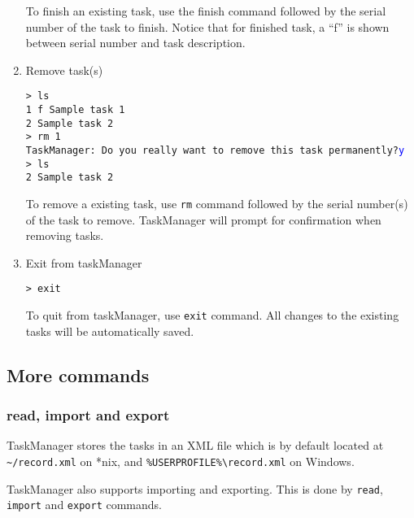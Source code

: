 \documentclass[12pt, a4paper]{article}
\begin{document}
\begin{enumerate}
To finish an existing task, use the finish command followed by the serial number of the task to finish. 
Notice that for finished task, a ``f'' is shown between serial number and task description.

\item Remove task(s)

\texttt{\textgreater \ ls\\
    1 f Sample task 1\\
    2   Sample task 2\\
    \textgreater \ rm 1\\
    TaskManager: Do you really want to remove this task permanently?\textcolor{blue}{y}\\
    \textgreater \ ls\\
    2   Sample task 2}

To remove a existing task, use \texttt{rm} command followed by the serial number(s) of the task to remove. TaskManager will prompt for confirmation when removing tasks.

\item Exit from taskManager

\texttt{\textgreater \ exit}

To quit from taskManager, use \texttt{exit} command. 
All changes to the existing tasks will be automatically saved.
\end{enumerate}

\subsection{More commands}
\subsubsection{read, import and export}

TaskManager stores the tasks in an XML file which is by default located at
\texttt{\~{}/record.xml} on *nix, and \texttt{\%USERPROFILE\%\textbackslash record.xml} on Windows.

TaskManager also supports importing and exporting. This is done by \texttt{read}, \texttt{import} and \texttt{export} commands.
\end{document}
